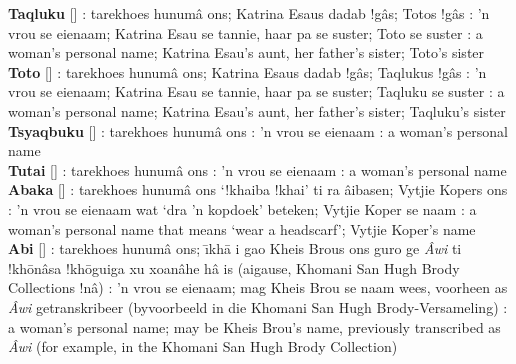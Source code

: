 \textbf{Taqluku} [] :
tarekhoes \textdoublebarpipe{}hunum\^{a} \textvertline{}ons; Katrina
Esaus dadab !g\^{a}s; Totos !g\^{a}s : 'n vrou se
eienaam; Katrina Esau se tannie, haar pa se suster; Toto se suster
: a woman's personal name; Katrina Esau's aunt, her
father's sister; Toto's sister \\

\textbf{Toto} [] : tarekhoes
\textdoublebarpipe{}hunum\^{a} \textvertline{}ons; Katrina Esaus dadab
!g\^{a}s; Taqlukus !g\^{a}s : 'n vrou se eienaam;
Katrina Esau se tannie, haar pa se suster; Taqluku se suster
: a woman's personal name; Katrina Esau's aunt, her
father's sister; Taqluku's sister \\

\textbf{Tsyaqbuku}
[]
: tarekhoes \textdoublebarpipe{}hunum\^{a}
\textvertline{}ons : 'n vrou se eienaam :
a woman's personal name \\

\textbf{Tutai} [] : tarekhoes
\textdoublebarpipe{}hunum\^{a} \textvertline{}ons : 'n
vrou se eienaam : a woman's personal name \\

\textbf{\textvertline{}Abaka} []
: tarekhoes \textdoublebarpipe{}hunum\^{a}
\textvertline{}ons `!khaiba !khai' ti ra
\textdoublebarpipe{}\^{a}ibasen; Vytjie Kopers \textvertline{}ons
: 'n vrou se eienaam wat `dra 'n kopdoek' beteken;
Vytjie Koper se naam : a woman's personal name that
means `wear a headscarf'; Vytjie Koper's name \\

\textbf{\textvertline{}Abi} []
: tarekhoes \textdoublebarpipe{}hunum\^{a}
\textvertline{}ons; \={\i}\textdoublevertline{}kh\={a} i gao Kheis
Brous \textvertline{}ons \textdoublebarpipe{}guro ge
\emph{\textvertline{}\^{A}wi} ti !kh\={o}\textdoublevertline{}n\^{a}sa
!kh\={o}\textdoublevertline{}guiga xu xoa\textdoublevertline{}n\^{a}he
h\^{a} is (ai\textdoublevertline{}gause, \textdoublebarpipe{}Khomani
San Hugh Brody Collections !n\^{a}) : 'n vrou se
eienaam; mag Kheis Brou se naam wees, voorheen as
\emph{\textvertline{}\^{A}wi} getranskribeer (byvoorbeeld in die
\textdoublebarpipe{}Khomani San Hugh Brody-Versameling)
: a woman's personal name; may be Kheis Brou's name,
previously transcribed as \emph{\textvertline{}\^{A}wi} (for example,
in the \textdoublebarpipe{}Khomani San Hugh Brody Collection) \\

